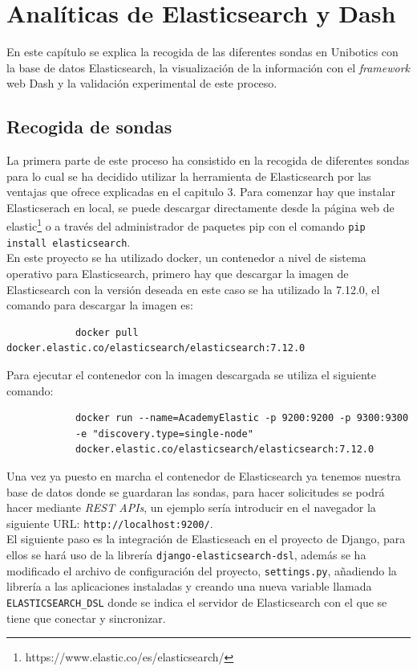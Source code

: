 \chapter{Analíticas de Elasticsearch y Dash}
\label{analiticas}
En este capítulo se explica la recogida de las diferentes sondas en Unibotics con la base de datos Elasticsearch, la visualización de la información con el \textit{framework} web Dash y la validación experimental de este proceso.
\section{Recogida de sondas}
La primera parte de este proceso ha consistido en la recogida de diferentes sondas para lo cual se ha decidido utilizar la herramienta de Elasticsearch por las ventajas que ofrece explicadas en el capitulo 3. Para comenzar hay que instalar Elasticserach en local, se puede descargar directamente desde la página web de elastic\footnote{https://www.elastic.co/es/elasticsearch/} o a través del administrador de paquetes pip con el comando \texttt{pip install elasticsearch}.\\

En este proyecto se ha utilizado docker, un contenedor a nivel de sistema operativo para Elasticsearch, primero hay que descargar la imagen de Elasticsearch con la versión deseada en este caso se ha utilizado la 7.12.0, el comando para descargar la imagen es:
{\footnotesize
		\begin{verbatim}
			docker pull docker.elastic.co/elasticsearch/elasticsearch:7.12.0
		\end{verbatim}
		}
Para ejecutar el contenedor con la imagen descargada se utiliza el siguiente comando:
{\footnotesize
		\begin{verbatim}
			docker run --name=AcademyElastic -p 9200:9200 -p 9300:9300
            -e "discovery.type=single-node" 
            docker.elastic.co/elasticsearch/elasticsearch:7.12.0
		\end{verbatim}
		}
        
  Una vez ya puesto en marcha el contenedor de Elasticsearch ya tenemos nuestra base de datos donde se guardaran las sondas, para hacer solicitudes se podrá hacer mediante \textit{REST APIs}, un ejemplo sería introducir en el navegador la siguiente URL: \texttt{http://localhost:9200/}.\\
  
  El siguiente paso es la integración de Elasticseach en el proyecto de Django, para ellos se hará uso de la librería \texttt{django-elasticsearch-dsl}, además se ha modificado el archivo de configuración del proyecto, \texttt{settings.py},  añadiendo la librería a las aplicaciones instaladas y creando una nueva variable llamada \texttt{ELASTICSEARCH\_DSL} donde se indica el servidor de Elasticsearch con el que se tiene que conectar y sincronizar.\\
  
